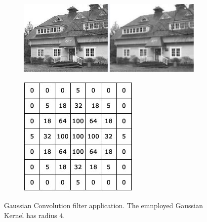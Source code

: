 \begin{figure}
	\begin{subfigure}{1.0\textwidth}
		\includegraphics[width=\linewidth]{./images/opencal/gaussian_example}
		
			
	\end{subfigure}
	
	\endminipage\hfill
	\begin{subfigure}{0.9\textwidth}
		\includegraphics[width=\linewidth]{./images/opencal/conv-gaussian-blur}	
	\end{subfigure}
	\endminipage\hfill
	\caption{Gaussian Convolution filter application. The emnployed Gaussian Kernel has radius $4$.}
	\label{fig:gaussian}
\end{figure}


